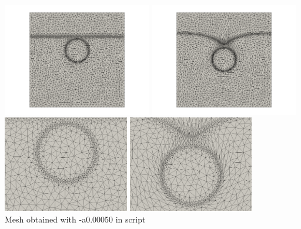 \begin{center}
\includegraphics[width=6.5cm]{python_codes/fieldstone_93/50/mesh0000}
\includegraphics[width=6.5cm]{python_codes/fieldstone_93/50/mesh0136}\\
\includegraphics[width=5.5cm]{python_codes/fieldstone_93/50/meshzoom0000}
\includegraphics[width=5.5cm]{python_codes/fieldstone_93/50/meshzoom0136}\\
{\captionfont  Mesh obtained with -a0.00050 in script}
\end{center}

